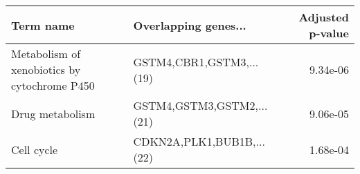 \begin{tabular}{llr}
\toprule
                                   Term name &      Overlapping genes... &  Adjusted p-value \\
\midrule
Metabolism of xenobiotics by cytochrome P450 &  GSTM4,CBR1,GSTM3,...(19) &          9.34e-06 \\
                             Drug metabolism & GSTM4,GSTM3,GSTM2,...(21) &          9.06e-05 \\
                                  Cell cycle & CDKN2A,PLK1,BUB1B,...(22) &          1.68e-04 \\
\bottomrule
\end{tabular}
